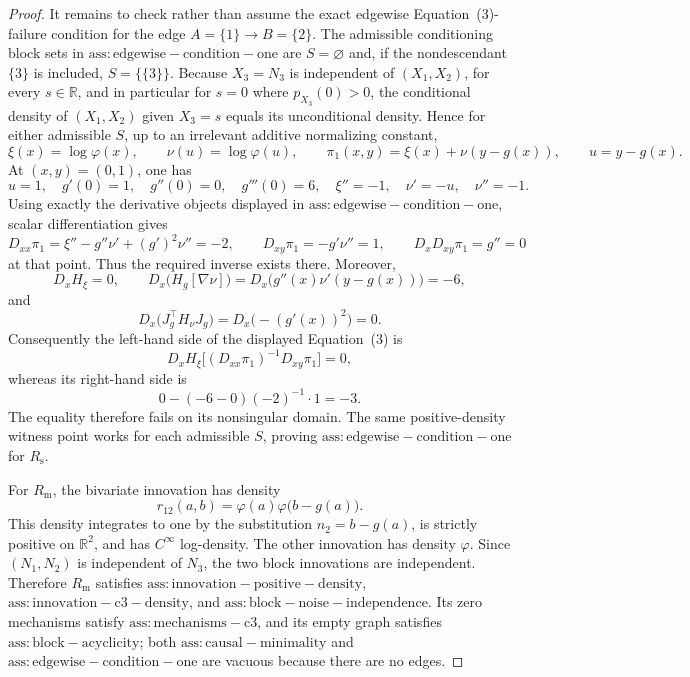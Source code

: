 \documentclass{article}
\begin{document}
\begin{proof}
It remains to check rather than assume the exact edgewise Equation~(3)-failure condition for the edge \(A=\{1\}\to B=\{2\}\).  The admissible conditioning block sets in \(\mathrm{ass:edgewise-condition-one}\) are \(S=\varnothing\) and, if the nondescendant \(\{3\}\) is included, \(S=\{\{3\}\}\).  Because \(X_3=N_3\) is independent of \((X_1,X_2)\), for every \(s\in\mathbb R\), and in particular for \(s=0\) where \(p_{X_3}(0)>0\), the conditional density of \((X_1,X_2)\) given \(X_3=s\) equals its unconditional density.  Hence for either admissible \(S\), up to an irrelevant additive normalizing constant,
\[
 \xi(x)=\log\varphi(x),\qquad
 \nu(u)=\log\varphi(u),\qquad
 \pi_1(x,y)=\xi(x)+\nu(y-g(x)),
 \qquad u=y-g(x).
\]
At \((x,y)=(0,1)\), one has
\[
 u=1,\quad g'(0)=1,\quad g''(0)=0,\quad g'''(0)=6,
 \quad \xi''=-1,\quad \nu'=-u,\quad \nu''=-1.
\]
Using exactly the derivative objects displayed in \(\mathrm{ass:edgewise-condition-one}\), scalar differentiation gives
\[
 D_{xx}\pi_1
   =\xi''-g''\nu'+(g')^2\nu''=-2,
 \qquad
 D_{xy}\pi_1=-g'\nu''=1,
 \qquad
 D_xD_{xy}\pi_1=g''=0
\]
at that point.  Thus the required inverse exists there.  Moreover,
\[
 D_xH_\xi=0,
 \qquad
 D_x\bigl(H_g[\nabla\nu]\bigr)
   =D_x\bigl(g''(x)\nu'(y-g(x))\bigr)=-6,
\]
and
\[
 D_x\bigl(J_g^{\top}H_\nu J_g\bigr)
   =D_x\bigl(-(g'(x))^2\bigr)=0.
\]
Consequently the left-hand side of the displayed Equation~(3) is
\[
 D_xH_\xi\bigl[(D_{xx}\pi_1)^{-1}D_{xy}\pi_1\bigr]=0,
\]
whereas its right-hand side is
\[
 0-(-6-0)(-2)^{-1}\cdot 1=-3.
\]
The equality therefore fails on its nonsingular domain.  The same positive-density witness point works for each admissible \(S\), proving \(\mathrm{ass:edgewise-condition-one}\) for \(R_{\mathrm{s}}\).

For \(R_{\mathrm{m}}\), the bivariate innovation has density
\[
 r_{12}(a,b)=\varphi(a)\varphi\bigl(b-g(a)\bigr).
\]
This density integrates to one by the substitution \(n_2=b-g(a)\), is strictly positive on \(\mathbb R^2\), and has \(C^\infty\) log-density.  The other innovation has density \(\varphi\).  Since \((N_1,N_2)\) is independent of \(N_3\), the two block innovations are independent.  Therefore \(R_{\mathrm{m}}\) satisfies \(\mathrm{ass:innovation-positive-density}\), \(\mathrm{ass:innovation-c3-density}\), and \(\mathrm{ass:block-noise-independence}\).  Its zero mechanisms satisfy \(\mathrm{ass:mechanisms-c3}\), and its empty graph satisfies \(\mathrm{ass:block-acyclicity}\); both \(\mathrm{ass:causal-minimality}\) and \(\mathrm{ass:edgewise-condition-one}\) are vacuous because there are no edges.


\end{proof}
\end{document}
